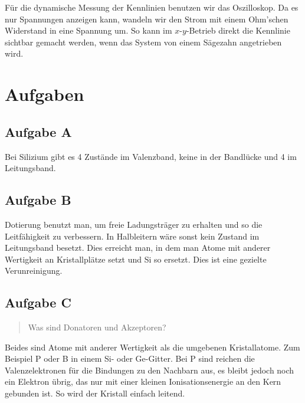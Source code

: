 Für die dynamische Messung der Kennlinien benutzen wir das Oszilloskop. Da es
nur Spannungen anzeigen kann, wandeln wir den Strom mit einem Ohm'schen
Widerstand in eine Spannung um. So kann im $x$-$y$-Betrieb direkt die Kennlinie
sichtbar gemacht werden, wenn das System von einem Sägezahn angetrieben wird.


\section{Aufgaben}

\subsection{Aufgabe A}

Bei Silizium gibt es 4 Zustände im Valenzband, keine in der Bandlücke und 4 im
Leitungsband. \cite[Vorlesung~16, Folie~13]{meschede/physik441}

\subsection{Aufgabe B}

Dotierung benutzt man, um freie Ladungsträger zu erhalten und so die Leitfähigkeit zu verbessern. In Halbleitern wäre
sonst kein Zustand im Leitungsband besetzt. Dies erreicht man, in dem man Atome
mit anderer Wertigkeit an Kristallplätze setzt und Si so ersetzt. Dies ist eine
gezielte Verunreinigung.

\subsection{Aufgabe C}

\begin{quote}
	Was sind Donatoren und Akzeptoren?
\end{quote}

Beides sind Atome mit anderer Wertigkeit als die umgebenen Kristallatome. Zum
Beispiel P oder B in einem Si- oder Ge-Gitter. Bei P sind reichen die
Valenzelektronen für die Bindungen zu den Nachbarn aus, es bleibt jedoch noch
ein Elektron übrig, das nur mit einer kleinen Ionisationsenergie an den Kern
gebunden ist. So wird der Kristall einfach leitend.

